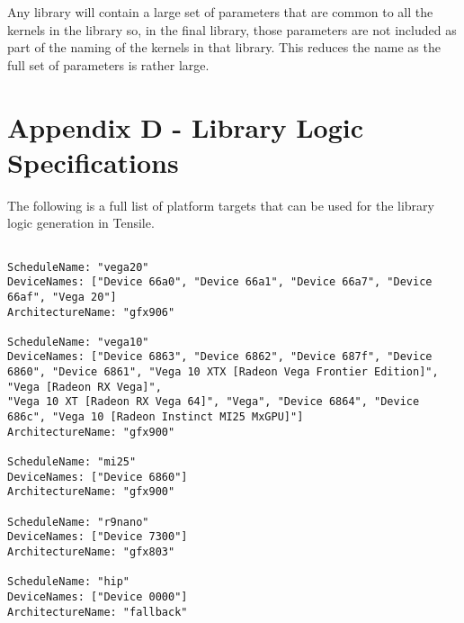 \documentclass[]{article}
\begin{document}
Any library will contain a large set of parameters that are common to all the kernels in the library so, in the final library, those parameters are not included as part of the naming of the kernels in that library. This reduces the name as the full set of parameters is rather large.

\section{Appendix D - Library Logic Specifications}
\label{sec:appendixD}

The following is a full list of platform targets that can be used for the library logic generation in Tensile.

\begin{verbatim}

ScheduleName: "vega20"
DeviceNames: ["Device 66a0", "Device 66a1", "Device 66a7", "Device 66af", "Vega 20"]
ArchitectureName: "gfx906"

ScheduleName: "vega10"
DeviceNames: ["Device 6863", "Device 6862", "Device 687f", "Device 6860", "Device 6861", "Vega 10 XTX [Radeon Vega Frontier Edition]", "Vega [Radeon RX Vega]",
"Vega 10 XT [Radeon RX Vega 64]", "Vega", "Device 6864", "Device 686c", "Vega 10 [Radeon Instinct MI25 MxGPU]"]
ArchitectureName: "gfx900"

ScheduleName: "mi25"
DeviceNames: ["Device 6860"]
ArchitectureName: "gfx900"

ScheduleName: "r9nano"
DeviceNames: ["Device 7300"]
ArchitectureName: "gfx803"

ScheduleName: "hip"
DeviceNames: ["Device 0000"]
ArchitectureName: "fallback"

\end{verbatim}
\end{document}
